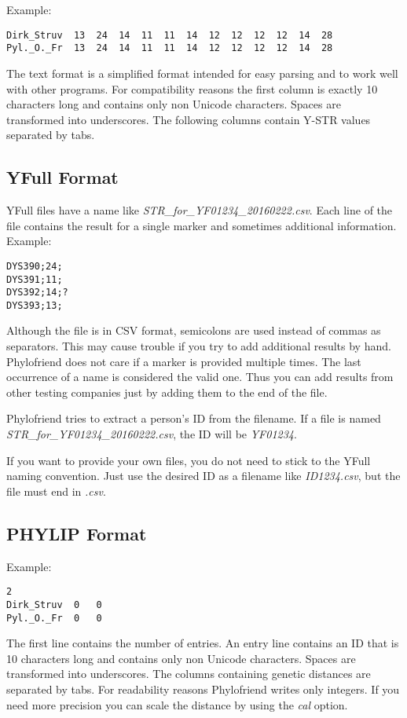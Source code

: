 Example:

\begin{verbatim}
Dirk_Struv	13	24	14	11	11	14	12	12	12	12	14	28
Pyl._O._Fr	13	24	14	11	11	14	12	12	12	12	14	28
\end{verbatim}

The text format is a simplified format intended for easy
parsing and to work well with other programs. For compatibility
reasons the first column is exactly 10 characters long and
contains only non Unicode characters. Spaces are transformed into
underscores. The following columns contain Y-STR values
separated by tabs.


\subsection{YFull Format}

YFull files have a name like \emph{STR\_for\_YF01234\_20160222.csv}.
Each line of the file contains the result for a single marker and
sometimes additional information. Example:

\begin{verbatim}
DYS390;24;
DYS391;11;
DYS392;14;?
DYS393;13;
\end{verbatim}

Although the file is in CSV format, semicolons are used instead
of commas as separators. This may cause trouble if you try to
add additional results by hand. Phylofriend does not care if a
marker is provided multiple times. The last occurrence of a name
is considered the valid one. Thus you can add results from other
testing companies just by adding them to the end of the file.

Phylofriend tries to extract a person's ID from the filename. If
a file is named \emph{STR\_for\_YF01234\_20160222.csv}, the ID
will be \emph{YF01234}.

If you want to provide your own files, you do not need to stick
to the YFull naming convention. Just use the desired ID as a
filename like \emph{ID1234.csv}, but the file must end in 
\emph{.csv}.


\subsection{PHYLIP Format}

Example:

\begin{verbatim}
2
Dirk_Struv	0	0
Pyl._O._Fr	0	0
\end{verbatim}

The first line contains the number of entries. An entry
line contains an ID that is 10 characters long and contains
only non Unicode characters. Spaces are transformed into
underscores. The columns containing genetic distances
are separated by tabs. For readability reasons
Phylofriend writes only integers. If you need more precision
you can scale the distance by using the \emph{cal} option.







